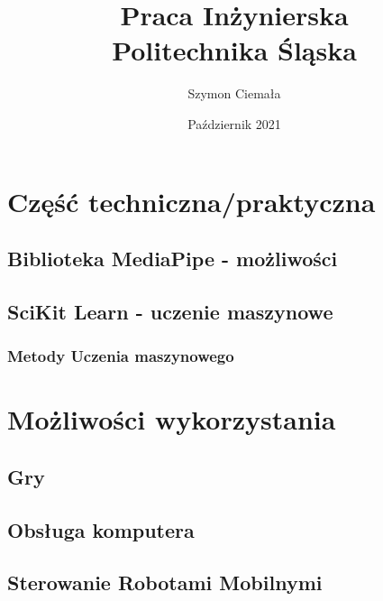 \documentclass[a4paper,12pt]{report}
\title{Praca Inżynierska\\{\Large Politechnika Śląska}}
\author{Szymon Ciemała}
\date{Październik 2021}
\begin{document}
\maketitle

\tableofcontents





\chapter{Część techniczna/praktyczna}
\section{Biblioteka MediaPipe - możliwości}
\section{SciKit Learn - uczenie maszynowe}
\subsection{Metody Uczenia maszynowego}

\chapter{Możliwości wykorzystania}
\section{Gry}
\section{Obsługa komputera}
\section{Sterowanie Robotami Mobilnymi}
\end{document}
